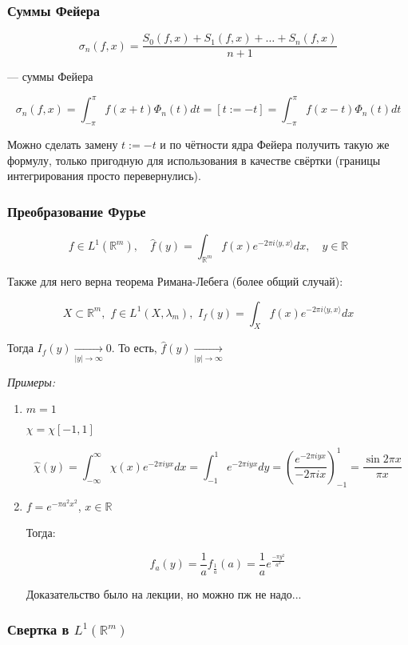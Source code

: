 \documentclass{article}
\def\dbl{\,\,}
\def\goesto#1{\underset{#1}{\longrightarrow}}
\def\sk#1#2{\langle #1, #2 \rangle}
\begin{document}
\subsubsection{Суммы Фейера}

\[\sigma_n(f, x) = \frac{S_0(f, x) + S_1(f, x) + \ldots + S_n(f, x)}{n + 1}\]

--- суммы Фейера

\[\sigma_n(f, x) = \int_{-\pi}^\pi f(x + t) \Phi_n(t) dt = [t := -t] = \int_{-\pi}^{\pi} f(x - t)\Phi_n(t)dt\]

Можно сделать замену $t := -t$ и по чётности ядра Фейера получить такую же формулу, только пригодную для использования в качестве свёртки (границы интегрирования просто перевернулись).

\subsubsection{Преобразование Фурье}

\[f \in L^1(\mathbb{R}^m), \quad \hat{f}(y) = \int_{\mathbb{R}^m} f(x)e^{-2\pi i\sk{y}{x}}dx, \quad y \in \mathbb{R}\]

Также для него верна теорема Римана-Лебега (более общий случай):

\[X \subset \mathbb{R}^m, \dbl f \in L^1(X, \lambda_m), \dbl I_f(y) = \int_{X} f(x)e^{-2\pi i \sk{y}{x}} dx\]

Тогда $I_f(y) \goesto{|y| \rightarrow \infty} 0$. То есть, $\hat{f}(y) \goesto{|y| \rightarrow \infty}$

\textit{Примеры: }

\begin{enumerate}
    \item $m = 1$
    
    $\chi = \chi[-1, 1]$

    \[\hat{\chi}(y) = \int_{-\infty}^{\infty} \chi(x)e^{-2\pi i yx} dx = \int_{-1}^{1} e^{-2 \pi i y x} dy = \left(\frac{e^{-2\pi i y x}}{-2\pi i x}\right)_{-1}^{1} = \frac{\sin 2\pi x}{\pi x}\]

    \item $f = e^{-\pi a^2 x^2}$, $x \in \mathbb{R}$
    
    Тогда:

    \[\widehat{f_a}(y) = \frac{1}{a}f_{\frac{1}{a}}(a) = \frac{1}{a}e^{\frac{-\pi y^2}{a^2}}\] 

    Доказательство было на лекции, но можно пж не надо...
\end{enumerate}
\subsubsection{Свертка в $L^1(\mathbb R^m)$}
\end{document}
